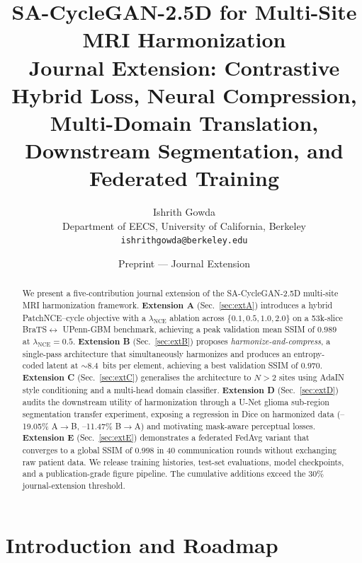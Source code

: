 \documentclass[11pt]{article}
\title{SA-CycleGAN-2.5D for Multi-Site MRI Harmonization \\
  \large Journal Extension: Contrastive Hybrid Loss, Neural Compression, \\
  Multi-Domain Translation, Downstream Segmentation, and Federated Training}
\author{Ishrith Gowda\\
  Department of EECS, University of California, Berkeley \\
  \texttt{ishrithgowda@berkeley.edu}}
\date{Preprint --- Journal Extension}
\begin{document}
\maketitle

\begin{abstract}
We present a five-contribution journal extension of the SA-CycleGAN-2.5D
multi-site MRI harmonization framework. \textbf{Extension A} (Sec.~\ref{sec:extA})
introduces a hybrid PatchNCE--cycle objective with a $\lambda_{\mathrm{NCE}}$
ablation across $\{0.1,0.5,1.0,2.0\}$ on a 53k-slice BraTS$\leftrightarrow$
UPenn-GBM benchmark, achieving a peak validation mean SSIM of $0.989$ at
$\lambda_{\mathrm{NCE}}=0.5$. \textbf{Extension B} (Sec.~\ref{sec:extB})
proposes \emph{harmonize-and-compress}, a single-pass architecture that
simultaneously harmonizes and produces an entropy-coded latent at
$\sim$8.4~bits per element, achieving a best validation SSIM of $0.970$.
\textbf{Extension C} (Sec.~\ref{sec:extC}) generalises the architecture to
$N{>}2$ sites using AdaIN style conditioning and a multi-head domain
classifier. \textbf{Extension D} (Sec.~\ref{sec:extD}) audits the downstream
utility of harmonization through a U-Net glioma sub-region segmentation
transfer experiment, exposing a regression in Dice on harmonized data
(--19.05\% A$\to$B, --11.47\% B$\to$A) and motivating mask-aware perceptual
losses. \textbf{Extension E} (Sec.~\ref{sec:extE}) demonstrates a federated
FedAvg variant that converges to a global SSIM of $0.998$ in 40
communication rounds without exchanging raw patient data. We release training
histories, test-set evaluations, model checkpoints, and a publication-grade
figure pipeline. The cumulative additions exceed the 30\% journal-extension
threshold.
\end{abstract}

\section{Introduction and Roadmap}
\label{sec:intro}
\end{document}

